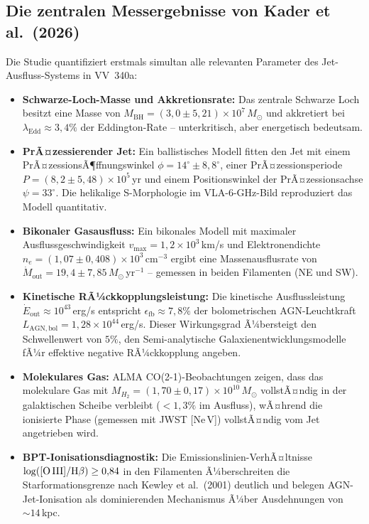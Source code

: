﻿\documentclass[12pt,a4paper]{report}
\begin{document}
\subsection{Die zentralen Messergebnisse von Kader et al.\ (2026)}

Die Studie quantifiziert erstmals simultan alle relevanten Parameter des Jet-Ausfluss-Systems in VV~340a:

\begin{itemize}
	\item \textbf{Schwarze-Loch-Masse und Akkretionsrate:} Das zentrale Schwarze Loch besitzt eine Masse von $M_\mathrm{BH} = (3{,}0 \pm 5{,}21) \times 10^7\,M_\odot$ und akkretiert bei $\lambda_\mathrm{Edd} \approx 3{,}4\%$ der Eddington-Rate -- unterkritisch, aber energetisch bedeutsam.

	\item \textbf{PrÃ¤zessierender Jet:} Ein ballistisches Modell fitten den Jet mit einem PrÃ¤zessions\-Ã¶ffnungswinkel $\phi = 14^\circ \pm 8{,}8^\circ$, einer PrÃ¤zessionsperiode $P = (8{,}2 \pm 5{,}48) \times 10^5$\,yr und einem Positionswinkel der PrÃ¤zessionsachse $\psi = 33^\circ$. Die helikalige S-Morphologie im VLA-6-GHz-Bild reproduziert das Modell quantitativ.

	\item \textbf{Bikonaler Gasausfluss:} Ein bikonales Modell mit maximaler Ausflussgeschwindigkeit $v_\mathrm{max} = 1{,}2 \times 10^3$\,km/s und Elektronendichte $n_e = (1{,}07 \pm 0{,}408) \times 10^3$\,cm$^{-3}$ ergibt eine Massenausflusrate von $\dot{M}_\mathrm{out} = 19{,}4 \pm 7{,}85\,M_\odot$\,yr$^{-1}$ -- gemessen in beiden Filamenten (NE und SW).

	\item \textbf{Kinetische RÃ¼ckkopplungsleistung:} Die kinetische Ausflussleistung $\dot{E}_\mathrm{out} \approx 10^{43}$\,erg/s entspricht $\epsilon_\mathrm{fb} \approx 7{,}8\%$ der bolometrischen AGN-Leuchtkraft $L_\mathrm{AGN,bol} = 1{,}28 \times 10^{44}$\,erg/s. Dieser Wirkungsgrad Ã¼bersteigt den Schwellenwert von $5\%$, den Semi-analytische Galaxienentwicklungsmodelle fÃ¼r effektive negative RÃ¼ckkopplung angeben.

	\item \textbf{Molekulares Gas:} ALMA CO(2-1)-Beobachtungen zeigen, dass das molekulare Gas mit $M_{H_2} = (1{,}70 \pm 0{,}17) \times 10^{10}\,M_\odot$ vollstÃ¤ndig in der galaktischen Scheibe verbleibt ($<1{,}3\%$ im Ausfluss), wÃ¤hrend die ionisierte Phase (gemessen mit JWST [Ne\,V]) vollstÃ¤ndig vom Jet angetrieben wird.

	\item \textbf{BPT-Ionisationsdiagnostik:} Die Emissionslinien-VerhÃ¤ltnisse $\log([\text{O\,III}]/\text{H}\beta) \geq 0{,}84$ in den Filamenten Ã¼berschreiten die Starformationsgrenze nach Kewley et al.\ (2001) deutlich und belegen AGN-Jet-Ionisation als dominierenden Mechanismus Ã¼ber Ausdehnungen von $\sim 14$\,kpc.
\end{itemize}
\end{document}
